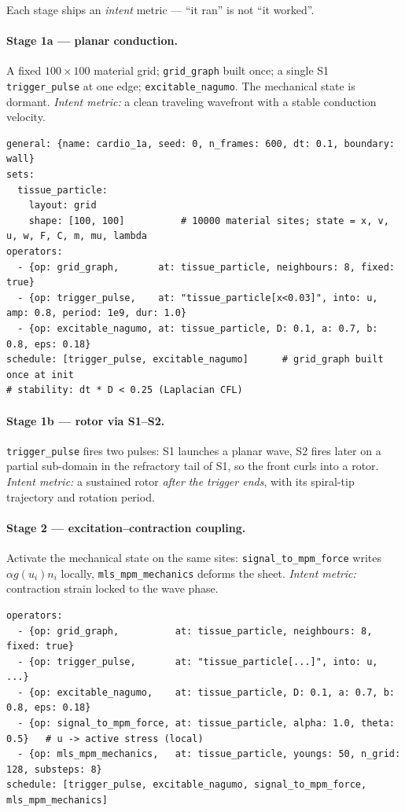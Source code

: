 \documentclass[11pt]{article}
\newcommand{\code}[1]{\texttt{#1}}
\begin{document}
Each stage ships an \emph{intent} metric --- ``it ran'' is not ``it worked''.

\paragraph{Stage 1a --- planar conduction.}
A fixed $100\times100$ material grid; \code{grid\_graph} built once; a single S1
\code{trigger\_pulse} at one edge; \code{excitable\_nagumo}. The mechanical state is
dormant. \emph{Intent metric:} a clean traveling wavefront with a stable conduction
velocity.

\begin{lstlisting}[style=yaml,caption={Stage 1a spec sketch (electrical only; names match the registry).}]
general: {name: cardio_1a, seed: 0, n_frames: 600, dt: 0.1, boundary: wall}
sets:
  tissue_particle:
    layout: grid
    shape: [100, 100]          # 10000 material sites; state = x, v, u, w, F, C, m, mu, lambda
operators:
  - {op: grid_graph,       at: tissue_particle, neighbours: 8, fixed: true}
  - {op: trigger_pulse,    at: "tissue_particle[x<0.03]", into: u, amp: 0.8, period: 1e9, dur: 1.0}
  - {op: excitable_nagumo, at: tissue_particle, D: 0.1, a: 0.7, b: 0.8, eps: 0.18}
schedule: [trigger_pulse, excitable_nagumo]      # grid_graph built once at init
# stability: dt * D < 0.25 (Laplacian CFL)
\end{lstlisting}

\paragraph{Stage 1b --- rotor via S1--S2.}
\code{trigger\_pulse} fires two pulses: S1 launches a planar wave, S2 fires later on
a partial sub-domain in the refractory tail of S1, so the front curls into a rotor.
\emph{Intent metric:} a sustained rotor \emph{after the trigger ends}, with its
spiral-tip trajectory and rotation period.

\paragraph{Stage 2 --- excitation--contraction coupling.}
Activate the mechanical state on the same sites: \code{signal\_to\_mpm\_force} writes
$\alpha g(u_i)n_i$ locally, \code{mls\_mpm\_mechanics} deforms the sheet.
\emph{Intent metric:} contraction strain locked to the wave phase.

\begin{lstlisting}[style=yaml,caption={Stage 2 spec sketch: add the local force and the MPM cycle on the same set.}]
operators:
  - {op: grid_graph,          at: tissue_particle, neighbours: 8, fixed: true}
  - {op: trigger_pulse,       at: "tissue_particle[...]", into: u, ...}
  - {op: excitable_nagumo,    at: tissue_particle, D: 0.1, a: 0.7, b: 0.8, eps: 0.18}
  - {op: signal_to_mpm_force, at: tissue_particle, alpha: 1.0, theta: 0.5}   # u -> active stress (local)
  - {op: mls_mpm_mechanics,   at: tissue_particle, youngs: 50, n_grid: 128, substeps: 8}
schedule: [trigger_pulse, excitable_nagumo, signal_to_mpm_force, mls_mpm_mechanics]
\end{lstlisting}
\end{document}
